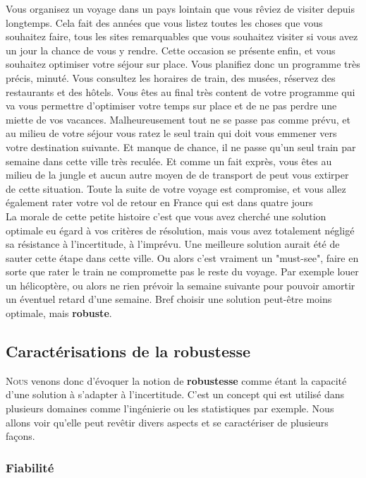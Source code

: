 Vous organisez un voyage dans un pays lointain que vous rêviez de visiter depuis longtemps. Cela fait des années que vous listez toutes les choses que vous souhaitez faire, tous les sites remarquables que vous souhaitez visiter si vous avez un jour la chance de vous y rendre. Cette occasion se présente enfin, et vous souhaitez optimiser votre séjour sur place. Vous planifiez donc un programme très précis, minuté. Vous consultez les horaires de train, des musées, réservez des restaurants et des hôtels. Vous êtes au final très content de votre programme qui va vous permettre d'optimiser votre temps sur place et de ne pas perdre une miette de vos vacances. Malheureusement tout ne se passe pas comme prévu, et au milieu de votre séjour vous ratez le seul train qui doit vous emmener vers votre destination suivante. Et manque de chance, il ne passe qu'un seul train par semaine dans cette ville très reculée. Et comme un fait exprès, vous êtes au milieu de la jungle et aucun autre moyen de de transport de peut vous extirper de cette situation. Toute la suite de votre voyage est compromise, et vous allez également rater votre vol de retour en France qui est dans quatre jours \\

La morale de cette petite histoire c'est que vous avez cherché une solution optimale eu égard à vos critères de résolution, mais vous avez totalement négligé sa résistance à l'incertitude, à l'imprévu. Une meilleure solution aurait été de sauter cette étape dans cette ville. Ou alors c'est vraiment un "must-see", faire en sorte que rater le train ne compromette pas le reste du voyage. Par exemple louer un hélicoptère, ou alors ne rien prévoir la semaine suivante pour pouvoir amortir un éventuel retard d'une semaine. Bref choisir une solution peut-être moins optimale, mais \textbf{robuste}.


\subsection{Caractérisations de la robustesse}

\lettrine{N}{ous} venons donc d'évoquer la notion de \textbf{robustesse} comme étant la capacité d'une solution à s'adapter à l'incertitude. C'est un concept qui est utilisé dans plusieurs domaines comme l'ingénierie ou les statistiques par exemple. Nous allons voir qu'elle peut revêtir divers aspects et se caractériser de plusieurs façons. \\

\subsubsection*{Fiabilité}

